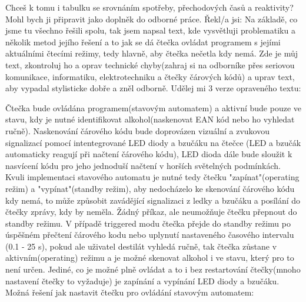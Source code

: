 Chceš k tomu i tabulku se srovnáním spotřeby, přechodových časů a reaktivity? Mohl bych ji připravit jako doplněk do odborné práce.
Řekl/a jsi:
Na základě, co jsme tu všechno řešili spolu, tak jsem napsal text, kde vysvětluji problematiku a několik metod jejího řešení a to jak se dá čtečka ovládat programem s jejími aktuálními čtecími režimy, tedy hlavně, aby čtečka nečetla kdy nemá. Zde je můj text, zkontroluj ho a oprav technické chyby(zahraj si na odborníke přes seriovou komunikace, informatiku, elektrotechniku a čtečky čárových kódů) a uprav text, aby vypadal stylisticke dobře a zněl odborně. Udělej mi 3 verze opraveného textu:

Čtečka bude ovládána programem(stavovým automatem) a aktivní bude pouze ve stavu, kdy je nutné identifikovat alkohol(naskenovat EAN kód nebo ho vyhledat ručně). Naskenování čárového kódu bude doprovázen vizuální a zvukovou signalizací pomocí intentegrované LED diody a bzučáku na čtečce (LED a bzučák automaticky reagují při načtení čárového kódu), LED dioda dále bude sloužit k nasvícení kódu pro jeho jednoduší načtení v horších světelných podmínkách. Kvuli implementaci stavového automatu je nutné tedy čtečku "zapínat"(operating režim) a "vypínat"(standby režim), aby nedocházelo ke skenování čárového kódu kdy nemá, to může způsobit zavádějící signalizaci z ledky a bzučáku a posílání do čtečky zprávy, kdy by neměla. Žádný příkaz, ale neumožňuje čtečku přepnout do standby režimu. V případě triggered modu čtečka přejde do standby režimu po úspěšném přečtení čárového kodu nebo uplynutí nastaveného časového intervalu (0.1 - 25 s), pokud ale uživatel destilát vyhledá ručně, tak čtečka zůstane v aktivním(operating) režimu a je možné skenovat alkohol i ve stavu, který pro to není určen. Jediné, co je možné plně ovládat a to i bez restartování čtečky(mnoho nastavení čtečky to vyžaduje) je zapínání a vypínání LED diody a bzučáku. Možná řešení jak nastavit čtečku pro ovládání stavovým automatem:

